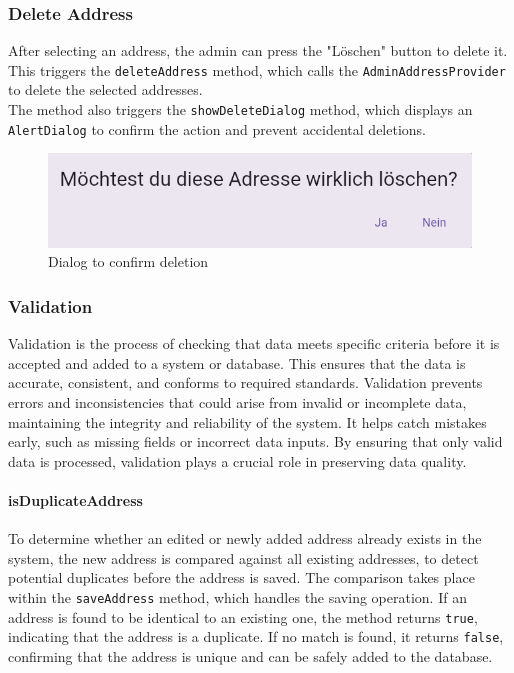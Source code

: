 \subsubsection{Delete Address}
After selecting an address, the admin can press the "Löschen" button to delete it. This triggers the \texttt{deleteAddress} method, which calls the \texttt{AdminAddressProvider} to delete the selected addresses.\\

The method also triggers the \texttt{showDeleteDialog} method, which displays an \texttt{AlertDialog} to confirm the action and prevent accidental deletions.

\begin{figure}[H]
    \centering
    \includegraphics[width=0.6\linewidth]{images/AdminPanel/DeleteDialog.png}
    \caption{Dialog to confirm deletion}
\end{figure}

\subsubsection{Validation}
\label{fig:Validation}
    Validation is the process of checking that data meets specific criteria before it is accepted and added to a system or database. This ensures that the data is accurate, consistent, and conforms to required standards. Validation prevents errors and inconsistencies that could arise from invalid or incomplete data, maintaining the integrity and reliability of the system. It helps catch mistakes early, such as missing fields or incorrect data inputs. By ensuring that only valid data is processed, validation plays a crucial role in preserving data quality. \autocite{ContributorstoWikimediaprojects2025Feb}

\paragraph{isDuplicateAddress}
    To determine whether an edited or newly added address already exists in the system, the new address is compared against all existing addresses, to detect potential duplicates before the address is saved. The comparison takes place within the \texttt{saveAddress} method, which handles the saving operation. If an address is found to be identical to an existing one, the method returns \texttt{true}, indicating that the address is a duplicate. If no match is found, it returns \texttt{false}, confirming that the address is unique and can be safely added to the database.\\

